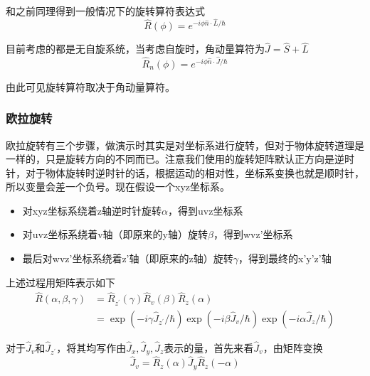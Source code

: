 \documentclass[UTF8]{ctexart}
\begin{document}
\noindent 和之前同理得到一般情况下的旋转算符表达式
\begin{equation}
    \hat{R}(\phi) = e^{-i \phi \hat{n} \cdot \hat{L}/\hbar}
\end{equation}

\noindent 目前考虑的都是无自旋系统，当考虑自旋时，角动量算符为$\hat{J} = \hat{S} + \hat{L}$
\begin{equation}
    \hat{R}_n(\phi) = e^{-i \phi \hat{n} \cdot \hat{J}/\hbar}
\end{equation}

    由此可见旋转算符取决于角动量算符。

    \subsubsection{欧拉旋转}
    欧拉旋转有三个步骤，做演示时其实是对坐标系进行旋转，但对于物体旋转道理是一样的，只是旋转方向的不同而已。注意我们使用的旋转矩阵默认正方向是逆时针，对于物体旋转时逆时针的话，根据运动的相对性，坐标系变换也就是顺时针，所以变量会差一个负号。现在假设一个xyz坐标系。
    \begin{itemize}
        \item 对xyz坐标系绕着z轴逆时针旋转$\alpha$，得到uvz坐标系
        \item 对uvz坐标系绕着v轴（即原来的y轴）旋转$\beta$，得到wvz'坐标系
        \item 最后对wvz'坐标系绕着z'轴（即原来的z轴）旋转$\gamma$，得到最终的x'y'z'轴
    \end{itemize}

\noindent 上述过程用矩阵表示如下
\begin{equation}
    \begin{aligned}
        \hat{R}(\alpha,\beta,\gamma) &= \hat{R}_{z^{\prime}}(\gamma) \hat{R}_v(\beta)\hat{R}_z(\alpha) \\
        &=\exp \left(-i\gamma \hat{J}_{z^{\prime}}/\hbar\right) \exp \left(-i\beta \hat{J}_{v}/\hbar\right) \exp \left(-i\alpha \hat{J}_{z}/\hbar\right)
    \end{aligned}
\end{equation}

    对于$\hat{J}_v$和$\hat{J}_{z^{\prime}}$，将其均写作由$\hat{J}_x,\hat{J}_y,\hat{J}_z$表示的量，首先来看$\hat{J}_v$，由矩阵变换
    \begin{equation}
        \hat{J}_v = \hat{R}_z(\alpha) \hat{J}_y \hat{R}_z(-\alpha) \label{equ5.4}
    \end{equation}
\end{document}
